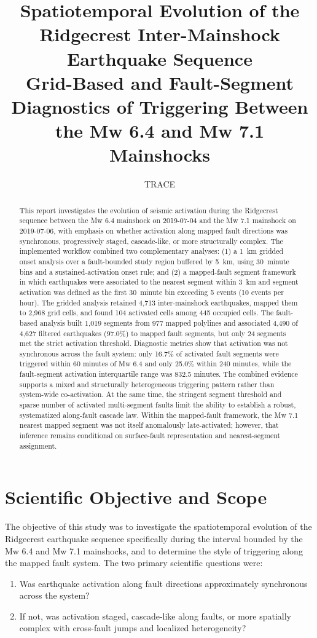 \documentclass[11pt]{article}
\title{Spatiotemporal Evolution of the Ridgecrest Inter-Mainshock Earthquake Sequence\\\large Grid-Based and Fault-Segment Diagnostics of Triggering Between the Mw 6.4 and Mw 7.1 Mainshocks}
\author{TRACE}
\date{}
\begin{document}
\maketitle

\begin{abstract}
This report investigates the evolution of seismic activation during the Ridgecrest sequence between the Mw 6.4 mainshock on 2019-07-04 and the Mw 7.1 mainshock on 2019-07-06, with emphasis on whether activation along mapped fault directions was synchronous, progressively staged, cascade-like, or more structurally complex. The implemented workflow combined two complementary analyses: (1) a \SI{1}{km} gridded onset analysis over a fault-bounded study region buffered by \SI{5}{km}, using \SI{30}{minute} bins and a sustained-activation onset rule; and (2) a mapped-fault segment framework in which earthquakes were associated to the nearest segment within \SI{3}{km} and segment activation was defined as the first \SI{30}{minute} bin exceeding 5 events (10 events per hour). The gridded analysis retained 4,713 inter-mainshock earthquakes, mapped them to 2,968 grid cells, and found 104 activated cells among 445 occupied cells. The fault-based analysis built 1,019 segments from 977 mapped polylines and associated 4,490 of 4,627 filtered earthquakes (97.0\%) to mapped fault segments, but only 24 segments met the strict activation threshold. Diagnostic metrics show that activation was not synchronous across the fault system: only 16.7\% of activated fault segments were triggered within 60 minutes of Mw 6.4 and only 25.0\% within 240 minutes, while the fault-segment activation interquartile range was 832.5 minutes. The combined evidence supports a mixed and structurally heterogeneous triggering pattern rather than system-wide co-activation. At the same time, the stringent segment threshold and sparse number of activated multi-segment faults limit the ability to establish a robust, systematized along-fault cascade law. Within the mapped-fault framework, the Mw 7.1 nearest mapped segment was not itself anomalously late-activated; however, that inference remains conditional on surface-fault representation and nearest-segment assignment.
\end{abstract}

\section{Scientific Objective and Scope}
The objective of this study was to investigate the spatiotemporal evolution of the Ridgecrest earthquake sequence specifically during the interval bounded by the Mw 6.4 and Mw 7.1 mainshocks, and to determine the style of triggering along the mapped fault system. The two primary scientific questions were:
\begin{enumerate}[label=(\arabic*)]
    \item Was earthquake activation along fault directions approximately synchronous across the system?
    \item If not, was activation staged, cascade-like along faults, or more spatially complex with cross-fault jumps and localized heterogeneity?
\end{enumerate}
\end{document}
